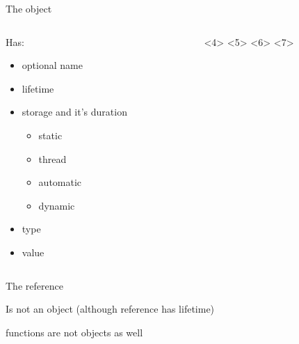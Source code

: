 \documentclass{panicsoftware-presentation}
\makeatletter
\newenvironment{itemizeSeq}{\begin{itemize}[<+-|alert@+>]}{\end{itemize}}
\makeatother
\begin{document}
\begin{frame}{The object}

\begin{columns}
\begin{column}{0.3\linewidth}

Has:
\begin{itemizeSeq}
	\item optional name
	\item lifetime
	\item storage and it's duration
	\begin{itemizeSeq}
		\item static
		\item thread
		\item automatic
		\item dynamic
	\end{itemizeSeq}
	\item type
	\item value
\end{itemizeSeq}

\end{column}

\begin{column}{0.5\linewidth}
<4>
<5>
<6>
<7>
\end{column}

\end{columns}
\end{frame}

\begin{frame}{The reference}

\centerline{Is not an object {\scriptsize(although reference has lifetime)}}

\centerline{\footnotesize functions are not objects as well}

\end{frame}
\end{document}
